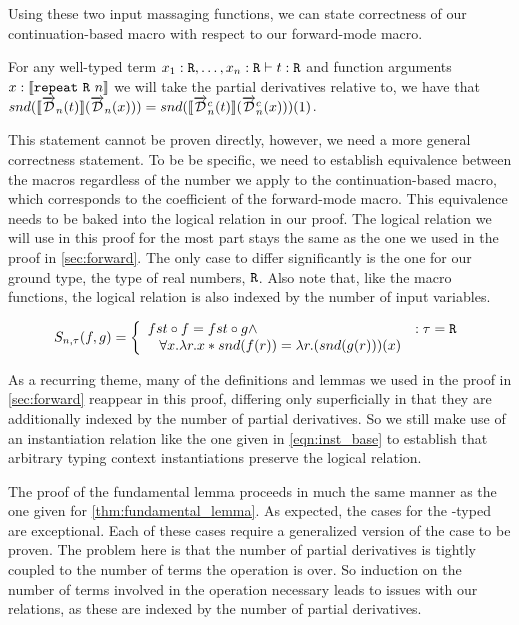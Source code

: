   Using these two input massaging functions, we can state correctness of our continuation-based macro with respect to our forward-mode macro.

  \begin{proposition}
    For any well-typed term $x_1 : \texttt{R}, \dots, x_n : \texttt{R} \vdash t : \texttt{R}$ and function arguments $x : \llbracket \texttt{repeat}\ \texttt{R}\ n \rrbracket$ we will take the partial derivatives relative to, we have that $snd(\llbracket\overrightarrow{\mathcal{D}}_n(t)\rrbracket (\overrightarrow{\mathcal{D}}_n(x))) = snd(\llbracket\overrightarrow{\mathcal{D}}^c_n(t)\rrbracket (\overrightarrow{\mathcal{D}}^c_n(x)))(1)$.
  \end{proposition}

  This statement cannot be proven directly, however, we need a more general correctness statement.
  To be be specific, we need to establish equivalence between the macros regardless of the number we apply to the continuation-based macro, which corresponds to the coefficient of the forward-mode macro.
  This equivalence needs to be baked into the logical relation in our proof.
  The logical relation we will use in this proof for the most part stays the same as the one we used in the proof in \cref{sec:forward}.
  The only case to differ significantly is the one for our ground type, the type of real numbers, $\texttt{R}$.
  Also note that, like the macro functions, the logical relation is also indexed by the number of input variables.

  \begin{equation}
    S_{n, \tau}(f, g) =
      \left\{
        \begin{array}{ll}
          fst \circ f = fst \circ g \wedge
            & : \tau = \texttt{R} \\
          \;\;\;\forall x. \lambda r. x * snd(f(r)) = \lambda r. (snd(g(r)))(x)
        \end{array}
      \right.
  \label{eqn:lr_continuous}
  \end{equation}

  As a recurring theme, many of the definitions and lemmas we used in the proof in \cref{sec:forward} reappear in this proof, differing only superficially in that they are additionally indexed by the number of partial derivatives.
  So we still make use of an instantiation relation like the one given in \cref{eqn:inst_base} to establish that arbitrary typing context instantiations preserve the logical relation.

  The proof of the fundamental lemma proceeds in much the same manner as the one given for \cref{thm:fundamental_lemma}.
  As expected, the cases for the \synR-typed are exceptional.
  Each of these cases require a generalized version of the case to be proven.
  The problem here is that the number of partial derivatives is tightly coupled to the number of terms the operation is over.
  So induction on the number of terms involved in the operation necessary leads to issues with our relations, as these are indexed by the number of partial derivatives.


